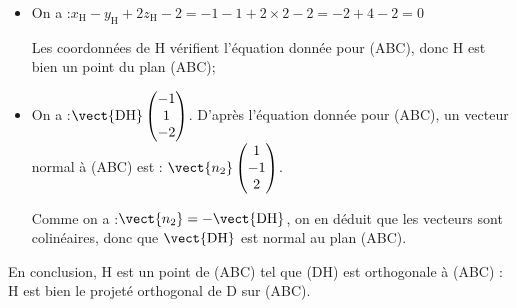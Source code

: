 \begin{itemize}
	\item On a :\quad $x_\mathrm{H} - y_{\mathrm{H}} +2z_{\mathrm{H}} - 2 = -1 - 1 + 2\times 2 - 2 = -2 + 4 - 2 = 0$

	Les coordonnées de H vérifient l'équation donnée pour (ABC), donc H est bien un point du plan (ABC);

	\item On a :\quad $\vect{\mathrm{DH}}\begin{pmatrix} -1\\1\\-2	\end{pmatrix}$.
	\qquad
	D'après l'équation donnée pour (ABC), un vecteur normal à (ABC) est :
	\quad
	$\vect{n_2} \begin{pmatrix} 1\\-1\\2	\end{pmatrix}$.

	Comme on a :\quad $\vect{n_2} = -\vect{\mathrm{DH}}$, \quad on en déduit que les vecteurs sont colinéaires, donc que $\vect{\mathrm{DH}}$ est normal au plan (ABC).
\end{itemize}

En conclusion, H est un point de (ABC) tel que (DH) est orthogonale à (ABC) : H est bien le projeté orthogonal de D sur (ABC).
